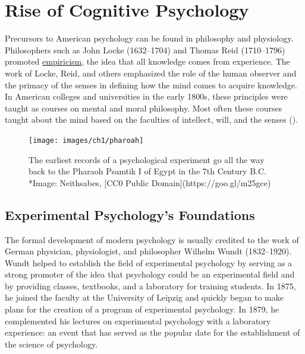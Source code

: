 \documentclass[
]{krantz}
\begin{document}
\section{Rise of Cognitive Psychology}\label{rise-of-cognitive-psychology}

Precursors to American psychology can be found in philosophy and physiology. Philosophers such as John Locke (1632--1704) and Thomas Reid (1710--1796) promoted \hyperref[empiricism]{empiricism}, the idea that all knowledge comes from experience. The work of Locke, Reid, and others emphasized the role of the human observer and the primacy of the senses in defining how the mind comes to acquire knowledge. In American colleges and universities in the early 1800s, these principles were taught as courses on mental and moral philosophy. Most often these courses taught about the mind based on the faculties of intellect, will, and the senses ().

\begin{figure}

{\centering \texttt{[image: images/ch1/pharoah]} 

}

\caption{The earliest records of a psychological experiment go all the way back to the Pharaoh Psamtik I of Egypt in the 7th Century B.C. *Image: Neithsabes, [CC0 Public Domain](https://goo.gl/m25gce)}\label{fig:pharoah}
\end{figure}

\subsection*{Experimental Psychology's Foundations}\label{experimental-psychologys-foundations}


The formal development of modern psychology is usually credited to the work of German physician, physiologist, and philosopher Wilhelm Wundt (1832--1920). Wundt helped to establish the field of experimental psychology by serving as a strong promoter of the idea that psychology could be an experimental field and by providing classes, textbooks, and a laboratory for training students. In 1875, he joined the faculty at the University of Leipzig and quickly began to make plans for the creation of a program of experimental psychology. In 1879, he complemented his lectures on experimental psychology with a laboratory experience: an event that has served as the popular date for the establishment of the science of psychology.
\end{document}
